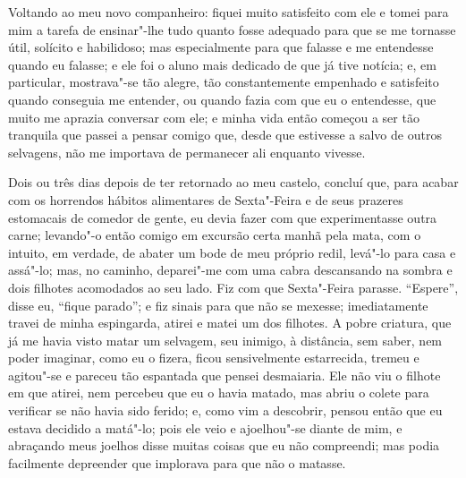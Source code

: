Voltando ao meu novo companheiro: fiquei muito satisfeito com ele e
tomei para mim a tarefa de ensinar"-lhe tudo quanto fosse adequado para
que se me tornasse útil, solícito e habilidoso; mas especialmente para
que falasse e me entendesse quando eu falasse; e ele foi o aluno mais
dedicado de que já tive notícia; e, em particular, mostrava"-se tão
alegre, tão constantemente empenhado e satisfeito quando conseguia me
entender, ou quando fazia com que eu o entendesse, que muito me aprazia
conversar com ele; e minha vida então começou a ser tão tranquila que
passei a pensar comigo que, desde que estivesse a salvo de outros
selvagens, não me importava de permanecer ali enquanto vivesse.

Dois ou três dias depois de ter retornado ao meu castelo, concluí que,
para acabar com os horrendos hábitos alimentares de Sexta"-Feira e de
seus prazeres estomacais de comedor de gente, eu devia fazer com que
experimentasse outra carne; levando"-o então comigo em excursão certa
manhã pela mata, com o intuito, em verdade, de abater um bode de meu
próprio redil, levá"-lo para casa e assá"-lo; mas, no caminho, deparei"-me
com uma cabra descansando na sombra e dois filhotes acomodados ao seu
lado. Fiz com que Sexta"-Feira parasse. ``Espere'', disse eu, ``fique
parado''; e fiz sinais para que não se mexesse; imediatamente travei de
minha espingarda, atirei e matei um dos filhotes. A pobre criatura, que
já me havia visto matar um selvagem, seu inimigo, à distância, sem
saber, nem poder imaginar, como eu o fizera, ficou sensivelmente
estarrecida, tremeu e agitou"-se e pareceu tão espantada que pensei
desmaiaria. Ele não viu o filhote em que atirei, nem percebeu que eu o
havia matado, mas abriu o colete para verificar se não havia sido
ferido; e, como vim a descobrir, pensou então que eu estava decidido a
matá"-lo; pois ele veio e ajoelhou"-se diante de mim, e abraçando meus
joelhos disse muitas coisas que eu não compreendi; mas podia facilmente
depreender que implorava para que não o matasse.

